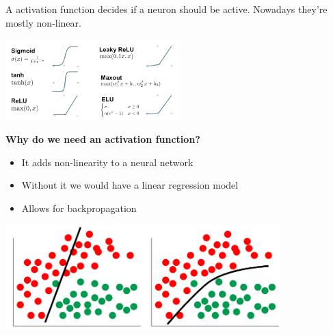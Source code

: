 \documentclass[
../../EiKI_Summary.tex,
]
{subfiles}
\begin{document}
\begin{defbox}
    A activation function decides if a neuron should be active. Nowadays they're mostly non-linear.

    \begin{center}
        \includegraphics[width=0.5\textwidth]{Pics/11/ActivationFunction.png}
    \end{center}

    \begin{minipage}
        [c]{0.5\textwidth}
        \textbf{Why do we need an activation function?}
        \begin{itemize}
            \item It adds non-linearity to a neural network
            \item Without it we would have a linear regression model
            \item Allows for backpropagation
        \end{itemize}
    \end{minipage}
    \begin{minipage}
        [c]{0.5\textwidth}
        \centering
        \includegraphics[width=0.8\textwidth]{Pics/11/Linear_NonLinear.png}
    \end{minipage}
\end{defbox}
\end{document}
